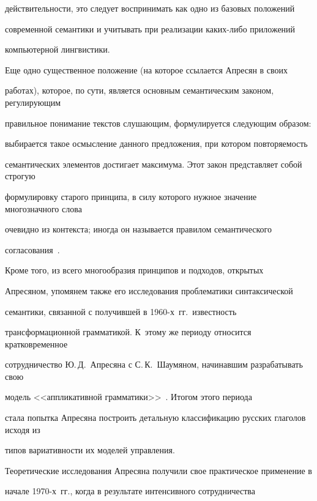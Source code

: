 действительности, это следует воспринимать как одно из базовых положений 


современной семантики и учитывать при реализации ка\-ких-ли\-бо приложений 


компьютерной лингвистики.


   


   Еще одно существенное положение (на которое ссылается Апресян в своих 


работах), которое, по сути, является основным семантическим законом, регулирующим 


правильное понимание текстов слушающим, формулируется следующим образом: 


выбирается такое осмысление данного предложения, при котором повторяемость 


семантических элементов достигает максимума. Этот закон пред\-став\-ля\-ет собой строгую 


формулировку старого принципа, в силу которого нужное значение многозначного слова 


очевидно из контекста; иногда он называется правилом семантического 


согласования~\cite{11-2-11, 12-2-11}.


   


   Кроме того, из всего многообразия принципов и подходов, открытых 


Апресяном, упомянем также его исследования проблематики синтаксической 


семантики, связанной с получившей в 1960-х~гг.\ известность 


трансформационной грамматикой. К~этому же периоду относится кратковременное 


сотрудничество Ю.\,Д.~Апресяна с С.\,К.~Шаумяном, начинавшим разрабатывать свою 


модель <<аппликативной грамматики>>~\cite{13-2-11, 14-2-11}. Итогом этого периода 


стала попытка Апресяна построить детальную классификацию русских глаголов исходя из 


типов вариативности их моделей управления. 


   


   Теоретические исследования Апресяна получили свое практическое применение в 


начале 1970-х~гг., когда в результате интенсивного сотрудничества 


